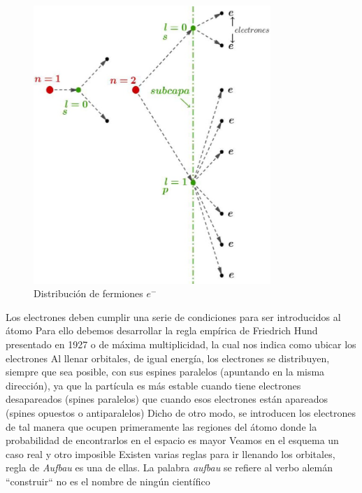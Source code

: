 \begin{figure}[H]
    \centering
    \includegraphics[width=0.8\textwidth]{./Figures/fig120}
	\caption{Distribución de fermiones $e^{-}$}
	\label{fig:120}
 \end{figure}


Los electrones deben cumplir una serie de condiciones para ser introducidos al átomo Para ello debemos desarrollar la regla empírica de Friedrich Hund presentado en 1927 o de máxima multiplicidad, la cual nos indica como ubicar los electrones Al llenar orbitales, de igual energía, los electrones se distribuyen, siempre que sea posible, con sus espines paralelos (apuntando en la misma dirección), ya que la partícula es más estable cuando tiene electrones desapareados (spines paralelos) que cuando esos electrones están apareados (spines opuestos o antiparalelos) Dicho de otro modo, se introducen los electrones de tal manera que ocupen primeramente las regiones del átomo donde la probabilidad de encontrarlos en el espacio es mayor Veamos en el esquema un caso real y otro imposible Existen varias reglas para ir llenando los orbitales, regla de \textit{Aufbau} es una de ellas. La palabra \textit{aufbau} se refiere al verbo alemán “construir“ no es el nombre de ningún científico

